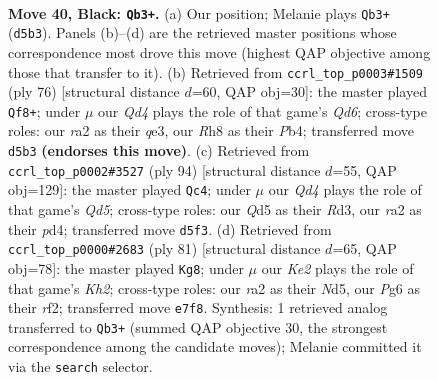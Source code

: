 \documentclass[11pt]{article}
\begin{document}
\clearpage

\begin{figure}[p]\centering
\begin{subfigure}{0.46\textwidth}\centering
\resizebox{\linewidth}{!}{%
\newchessgame
\chessboard[
  setfen={7r/r3k3/1pp3p1/3qp1p1/Pp1P4/3KP3/R5Q1/2B5 b - - 1 40},
  showmover=false,
  pgfstyle=straightmove, color=movearrow, markmove={d5-b3}
]}
\caption{}
\end{subfigure}\hfill
\begin{subfigure}{0.46\textwidth}\centering
\resizebox{\linewidth}{!}{%
\newchessgame
\chessboard[
  setfen={8/p7/1p1Qrk1p/1PP2p2/1P4pP/3Pq3/7P/R6K w - - 11 39},
  showmover=false,
  pgfstyle=straightmove, color=movearrow, markmove={d6-f8}
]}
\caption{}
\end{subfigure}
\\[4pt]
\begin{subfigure}{0.46\textwidth}\centering
\resizebox{\linewidth}{!}{%
\newchessgame
\chessboard[
  setfen={2qr2k1/5pPp/8/b1pQ2PP/p2pP3/3R1K2/8/7R w - - 7 48},
  showmover=false,
  pgfstyle=straightmove, color=movearrow, markmove={d5-c4}
]}
\caption{}
\end{subfigure}\hfill
\begin{subfigure}{0.46\textwidth}\centering
\resizebox{\linewidth}{!}{%
\newchessgame
\chessboard[
  setfen={8/pQ2q2k/P3p1p1/3nP1P1/5Pp1/6K1/5RB1/6r1 b - - 8 41},
  showmover=false,
  pgfstyle=straightmove, color=movearrow, markmove={h7-g8}
]}
\caption{}
\end{subfigure}
\caption{\textbf{Move 40, Black: \texttt{Qb3+}.} (a) Our position; Melanie plays \texttt{Qb3+} (\texttt{d5b3}). Panels (b)--(d) are the retrieved master positions whose correspondence most drove this move (highest QAP objective among those that transfer to it). (b) Retrieved from \texttt{ccrl\_top\_p0003\#1509} (ply 76) [structural distance $d$=60, QAP obj=30]: the master played \texttt{Qf8+}; under $\mu$ our \emph{Qd4} plays the role of that game's \emph{Qd6}; cross-type roles: our \emph{r}a2 as their \emph{q}e3, our \emph{R}h8 as their \emph{P}b4; transferred move \texttt{d5b3} \textbf{(endorses this move)}. (c) Retrieved from \texttt{ccrl\_top\_p0002\#3527} (ply 94) [structural distance $d$=55, QAP obj=129]: the master played \texttt{Qc4}; under $\mu$ our \emph{Qd4} plays the role of that game's \emph{Qd5}; cross-type roles: our \emph{Q}d5 as their \emph{R}d3, our \emph{r}a2 as their \emph{p}d4; transferred move \texttt{d5f3}. (d) Retrieved from \texttt{ccrl\_top\_p0000\#2683} (ply 81) [structural distance $d$=65, QAP obj=78]: the master played \texttt{Kg8}; under $\mu$ our \emph{Ke2} plays the role of that game's \emph{Kh2}; cross-type roles: our \emph{r}a2 as their \emph{N}d5, our \emph{P}g6 as their \emph{r}f2; transferred move \texttt{e7f8}. Synthesis: 1 retrieved analog transferred to \texttt{Qb3+} (summed QAP objective 30, the strongest correspondence among the candidate moves); Melanie committed it via the \texttt{search} selector.}
\label{fig:thought-m79}
\end{figure}
\end{document}
